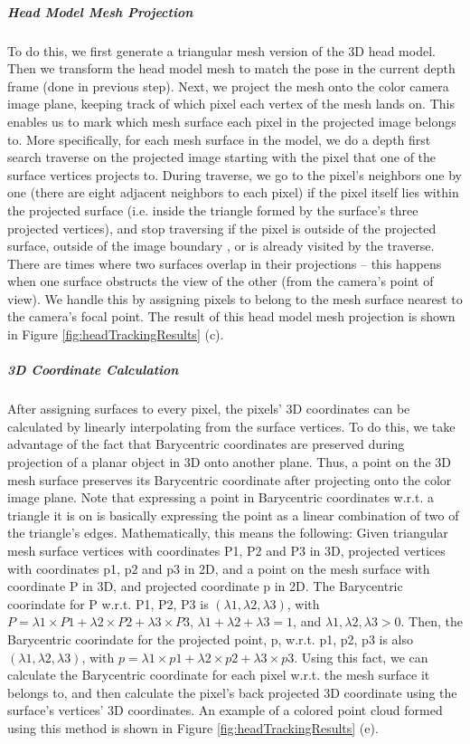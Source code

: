 \documentclass{ut-thesis}
\begin{document}
\subparagraph{Head Model Mesh Projection}
To do this, we first generate a triangular mesh version of the 3D head model.  Then we transform the head model mesh to match the pose in the current depth frame (done in previous step).  Next, we project the mesh onto the color camera image plane, keeping track of which pixel each vertex of the mesh lands on.  This enables us to mark which mesh surface each pixel in the projected image belongs to.  More specifically, for each mesh surface in the model, we do a depth first search traverse on the projected image starting with the pixel that one of the surface vertices projects to.  During traverse, we go to the pixel's neighbors one by one (there are eight adjacent neighbors to each pixel) if the pixel itself lies within the projected surface (i.e. inside the triangle formed by the surface's three projected vertices), and stop traversing if the pixel is outside of the projected surface, outside of the image boundary , or is already visited by the traverse.  There are times where two surfaces overlap in their projections -- this happens when one surface obstructs the view of the other (from the camera's point of view).  We handle this by assigning pixels to belong to the mesh surface nearest to the camera's focal point.  The result of this head model mesh projection is shown in Figure \ref{fig:headTrackingResults} (c).

\subparagraph{3D Coordinate Calculation}
After assigning surfaces to every pixel, the pixels' 3D coordinates can be calculated by linearly interpolating from the surface vertices.  To do this, we take advantage of the fact that Barycentric coordinates are preserved during projection of a planar object in 3D onto another plane.  Thus, a point on the 3D mesh surface preserves its Barycentric coordinate after projecting onto the color image plane.  Note that expressing a point in Barycentric coordinates w.r.t. a triangle it is on is basically expressing the point as a linear combination of two of the triangle's edges.  Mathematically, this means the following: Given triangular mesh surface vertices with coordinates P1, P2 and P3 in 3D, projected vertices with coordinates p1, p2 and p3 in 2D, and a point on the mesh surface with coordinate P in 3D, and projected coordinate p in 2D.  The Barycentric coorindate for P w.r.t. {P1, P2, P3} is \( (\lambda1, \lambda2, \lambda3)  \), with \( P = \lambda1 \times P1 + \lambda2 \times P2 + \lambda3 \times P3 \), \( \lambda1 + \lambda2 + \lambda3 = 1 \), and \( \lambda1, \lambda2, \lambda3 > 0 \).  Then, the Barycentric coorindate for the projected point, p, w.r.t. {p1, p2, p3} is also \( (\lambda1, \lambda2, \lambda3)  \), with \( p = \lambda1 \times p1 + \lambda2 \times p2 + \lambda3 \times p3 \).  Using this fact, we can calculate the Barycentric coordinate for each pixel w.r.t. the mesh surface it belongs to, and then calculate the pixel's back projected 3D coordinate using the surface's vertices' 3D coordinates.  An example of a colored point cloud formed using this method is shown in Figure \ref{fig:headTrackingResults} (e).
\end{document}
